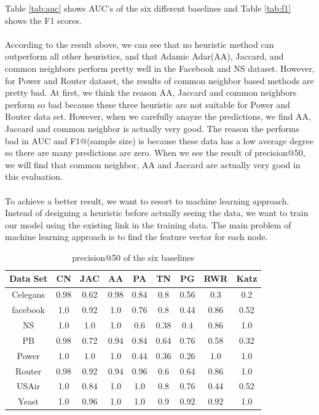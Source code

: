\documentclass[12pt]{article}
\begin{document}
Table \ref{tab:auc} shows AUC's of the six different baselines and Table \ref{tab:f1} shows the F1 scores.
\\
\\
According to the result above, we can see that no heuristic method can outperform all other heuristics, and that Adamic Adar(AA), Jaccard, and common neighbors perform pretty well in the Facebook and NS dataset. However, for Power and Router dataset, the results of common neighbor based methods are pretty bad. At first, we think the reason AA, Jaccard and common neighbors perform so bad because these three heuristic are not suitable for Power and Router data set. However, when we carefully anayze the predictions, we find AA, Jaccard and common neighbor is actually very good. The reason the performs bad in AUC and F1@(sample size) is because these data has a low average degree so there are many predictions are zero. When we see the result of precision@50, we will find that common neighbor, AA and Jaccard are actually very good in this evaluation.
\\
\\
To achieve a better result, we want to resort to machine learning approach. Instead of designing a heuristic before actually seeing the data, we want to train our model using the existing link in the training data. The main problem of machine learning approach is to find the feature vector for each node. 
\begin{table}
	\begin{center}
		\begin{tabular}{|c|c|c|c|c|c|c|c|c|}
			\hline
			Data Set & CN & JAC & AA & PA & TN & PG & RWR & Katz \\
			\hline
			Celegans&0.98&0.62&0.98&0.84&0.8&0.56&0.3&0.2\\
			facebook&1.0&0.92&1.0&0.76&0.8&0.44&0.86&0.52\\
			NS&1.0&1.0&1.0&0.6&0.38&0.4&0.86&1.0\\
			PB&0.98&0.72&0.94&0.84&0.64&0.76&0.58&0.32\\
			Power&1.0&1.0&1.0&0.44&0.36&0.26&1.0&1.0\\
			Router&0.98&0.92&0.94&0.96&0.6&0.64&0.86&1.0\\
			USAir&1.0&0.84&1.0&1.0&0.8&0.76&0.44&0.52\\
			Yeast&1.0&0.96&1.0&1.0&0.9&0.92&0.92&1.0\\
			\hline
		\end{tabular}
	\end{center}
	\caption{precision@50 of the six baselines}
	\label{tab:precision@50}
\end{table}
\end{document}
